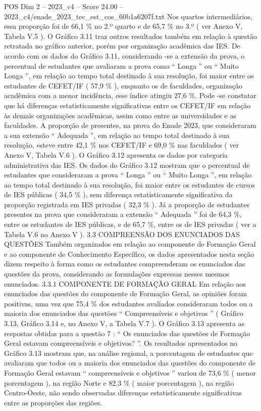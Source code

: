 \begin{textsample}{POS Dim 2 – 2023\_c4 – Score 24.00 – 2023\_c4/enade\_2023\_tec\_est\_cos\_60b1a6207f.txt}
Nos quartos intermediários, essa proporção foi de 66,1 \% no 2.º quarto e de 65,7 \% no 3.º ( ver Anexo V, Tabela V.5 ).
O Gráfico 3.11 traz outros resultados também em relação à questão retratada no gráfico anterior, porém por organização acadêmica das IES.
De acordo com os dados do Gráfico 3.11, considerando -se a extensão da prova, o percentual de estudantes que avaliaram a prova como “ Longa ” ou “ Muito Longa ”, em relação ao tempo total destinado à sua resolução, foi maior entre os estudantes de CEFET/IF ( 57,9 \% ), enquanto os de faculdades, organização acadêmica com a menor incidência, esse índice atingiu 27,6 \%.
Pode -se constatar que há diferenças estatisticamente significativas entre os CEFET/IF em relação às demais organizações acadêmicas, assim como entre as universidades e as faculdades.
A proporção de presentes, na prova do Enade 2023, que consideraram a sua extensão “ Adequada ”, em relação ao tempo total destinado à sua resolução, esteve entre 42,1 \% nos CEFET/IF e 69,0 \% nas faculdades ( ver Anexo V, Tabela V.6 ).
O Gráfico 3.12 apresenta os dados por categoria administrativa das IES.
Os dados do Gráfico 3.12 mostram que o percentual de estudantes que consideraram a prova “ Longa ” ou “ Muito Longa ”, em relação ao tempo total destinado à sua resolução, foi maior entre os estudantes de cursos de IES públicas ( 34,5 \% ), sem diferença estatisticamente significativa da proporção registrada em IES privadas ( 32,3 \% ).
Já a proporção de estudantes presentes na prova que consideraram a extensão “ Adequada ” foi de 64,3 \%, entre os estudantes de IES públicas, e de 65,7 \%, entre os de IES privadas ( ver a Tabela V.6 no Anexo V ). 3.3 COMPREENSÃO DOS ENUNCIADOS DAS QUESTÕES Também organizados em relação ao componente de Formação Geral e ao componente de Conhecimento Específico, os dados apresentados nesta seção dizem respeito à forma como os estudantes compreenderam os enunciados das questões da prova, considerando as formulações expressas nesses mesmos enunciados. 3.3.1 COMPONENTE DE FORMAÇÃO GERAL Em relação aos enunciados das questões do componente de Formação Geral, as opiniões foram positivas, uma vez que 75,4 \% dos estudantes avaliados consideraram todos ou a maioria dos enunciados das questões “ Compreensíveis e objetivos ” ( Gráfico 3.13, Gráfico 3.14 e, no Anexo V, a Tabela V.7 ).
O Gráfico 3.13 apresenta as respostas obtidas para a questão 7 : “ Os enunciados das questões de Formação Geral estavam compreensíveis e objetivos? ”.
Os resultados apresentados no Gráfico 3.13 mostram que, na análise regional, a porcentagem de estudantes que avaliaram que todos ou a maioria dos enunciados das questões do componente de Formação Geral estavam “ compreensíveis e objetivos ” variou de 73,6 \% ( menor porcentagem ), na região Norte e 82,3 \% ( maior porcentagem ), na região Centro-Oeste, não sendo observadas diferenças estatisticamente significativas entre as proporções das regiões.

\end{textsample}
